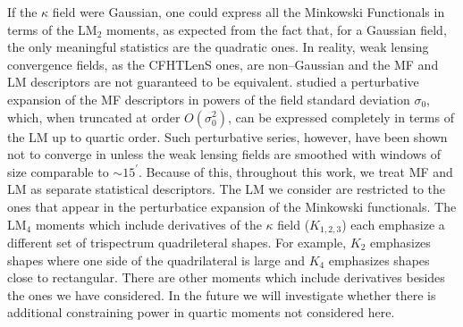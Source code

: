 \documentclass[reprint,aps,prd,superscriptaddress,showkeys,showpacs]{revtex4-1}
\begin{document}
%
If the $\kappa$ field were Gaussian, one could express all the Minkowski Functionals in terms of the LM$_2$ moments, as expected from the fact that, for a Gaussian field, the only meaningful statistics are the quadratic ones. In reality, weak lensing convergence fields, as the CFHTLenS ones, are non--Gaussian and the MF and LM descriptors are not guaranteed to be equivalent. \citep{Munshi12,Matsubara10} studied a perturbative expansion of the MF descriptors in powers of the field standard deviation $\sigma_0$, which, when truncated at order $O(\sigma_0^2)$, can be expressed completely in terms of the LM up to quartic order. Such perturbative series, however, have been shown not to converge in \citep{Petri2013} unless the weak lensing fields are smoothed with windows of size comparable to $\sim 15^\prime$. Because of this, throughout this work, we treat MF and LM as separate statistical descriptors. The LM we consider are restricted to the ones that appear in the perturbatice expansion of the Minkowski functionals. The LM$_4$ moments which include derivatives of the $\kappa$ field ($K_{1,2,3}$) each emphasize a different set of trispectrum quadrileteral shapes. For example, $K_2$ emphasizes shapes where one side of the quadrilateral is large and $K_4$ emphasizes shapes close to rectangular. There are other moments which include derivatives besides the ones we have considered. In the future we will investigate whether there is additional constraining power in quartic moments not considered here.
\end{document}
